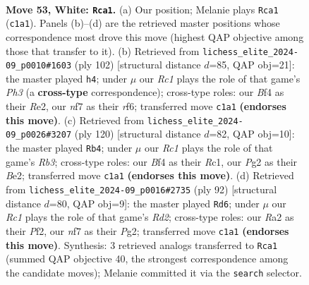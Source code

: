 \documentclass[11pt]{article}
\begin{document}
\clearpage

\begin{figure}[p]\centering
\begin{subfigure}{0.46\textwidth}\centering
\resizebox{\linewidth}{!}{%
\newchessgame
\chessboard[
  setfen={5b1r/p4nkp/P7/3r4/5B2/1Pp3KP/R1P3P1/2RB4 w - - 13 53},
  showmover=false,
  pgfstyle=straightmove, color=movearrow, markmove={c1-a1}
]}
\caption{}
\end{subfigure}\hfill
\begin{subfigure}{0.46\textwidth}\centering
\resizebox{\linewidth}{!}{%
\newchessgame
\chessboard[
  setfen={8/6kp/1p3rb1/1B6/P7/4R1PP/4RP1K/1r6 w - - 1 52},
  showmover=false,
  pgfstyle=straightmove, color=movearrow, markmove={h3-h4}
]}
\caption{}
\end{subfigure}
\\[4pt]
\begin{subfigure}{0.46\textwidth}\centering
\resizebox{\linewidth}{!}{%
\newchessgame
\chessboard[
  setfen={r7/6pk/1n4p1/1P4r1/4p3/1R2P3/4BP1P/2R2K2 w - - 19 61},
  showmover=false,
  pgfstyle=straightmove, color=movearrow, markmove={b3-b4}
]}
\caption{}
\end{subfigure}\hfill
\begin{subfigure}{0.46\textwidth}\centering
\resizebox{\linewidth}{!}{%
\newchessgame
\chessboard[
  setfen={5rk1/5b1p/1p6/1P3p2/1R6/7P/rB1R1PPK/8 w - - 0 47},
  showmover=false,
  pgfstyle=straightmove, color=movearrow, markmove={d2-d6}
]}
\caption{}
\end{subfigure}
\caption{\textbf{Move 53, White: \texttt{Rca1}.} (a) Our position; Melanie plays \texttt{Rca1} (\texttt{c1a1}). Panels (b)--(d) are the retrieved master positions whose correspondence most drove this move (highest QAP objective among those that transfer to it). (b) Retrieved from \texttt{lichess\_elite\_2024-09\_p0010\#1603} (ply 102) [structural distance $d$=85, QAP obj=21]: the master played \texttt{h4}; under $\mu$ our \emph{Rc1} plays the role of that game's \emph{Ph3} (a \textbf{cross-type} correspondence); cross-type roles: our \emph{B}f4 as their \emph{R}e2, our \emph{n}f7 as their \emph{r}f6; transferred move \texttt{c1a1} \textbf{(endorses this move)}. (c) Retrieved from \texttt{lichess\_elite\_2024-09\_p0026\#3207} (ply 120) [structural distance $d$=82, QAP obj=10]: the master played \texttt{Rb4}; under $\mu$ our \emph{Rc1} plays the role of that game's \emph{Rb3}; cross-type roles: our \emph{B}f4 as their \emph{R}c1, our \emph{P}g2 as their \emph{B}e2; transferred move \texttt{c1a1} \textbf{(endorses this move)}. (d) Retrieved from \texttt{lichess\_elite\_2024-09\_p0016\#2735} (ply 92) [structural distance $d$=80, QAP obj=9]: the master played \texttt{Rd6}; under $\mu$ our \emph{Rc1} plays the role of that game's \emph{Rd2}; cross-type roles: our \emph{R}a2 as their \emph{P}f2, our \emph{n}f7 as their \emph{P}g2; transferred move \texttt{c1a1} \textbf{(endorses this move)}. Synthesis: 3 retrieved analogs transferred to \texttt{Rca1} (summed QAP objective 40, the strongest correspondence among the candidate moves); Melanie committed it via the \texttt{search} selector.}
\label{fig:thought-m104}
\end{figure}
\end{document}
